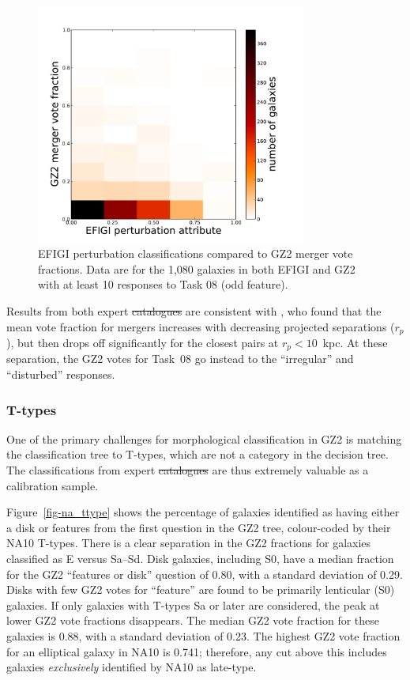 \documentclass[useAMS,usenatbib]{mn2e}
\providecommand{\DIFaddtex}[1]{{\protect\color{blue}\uwave{#1}}} %
\providecommand{\DIFdeltex}[1]{{\protect\color{red}\sout{#1}}}                      %
\providecommand{\DIFaddbegin}{} %
\providecommand{\DIFaddend}{} %
\providecommand{\DIFdelbegin}{} %
\providecommand{\DIFdelend}{} %
\providecommand{\DIFadd}[1]{\texorpdfstring{\DIFaddtex{#1}}{#1}} %
\providecommand{\DIFdel}[1]{\texorpdfstring{\DIFdeltex{#1}}{}} %
\begin{document}
\begin{figure}
\includegraphics[angle=0,width=3.5in]{figures/efigi_mergers.pdf}
\caption{EFIGI perturbation classifications compared to GZ2 merger vote fractions. Data are for the 1,080 galaxies in both EFIGI and GZ2 with at least 10 responses to Task 08 (odd feature). 
\label{fig-efigi_mergers}}
\end{figure}

Results from both expert \DIFdelbegin \DIFdel{catalogues }\DIFdelend \DIFaddbegin \DIFadd{catalogs }\DIFaddend are consistent with \citet{cas13}, who found that the mean vote fraction for mergers increases with decreasing projected separations ($r_p$), but then drops off significantly for the closest pairs at $r_p < 10$~kpc. At these separation, the GZ2 votes for Task~08 go instead to the ``irregular'' and ``disturbed'' responses. 

\subsubsection{T-types}

One of the primary challenges for morphological classification in GZ2 is matching the classification tree to T-types, which are not a category in the decision tree. The classifications from expert \DIFdelbegin \DIFdel{catalogues }\DIFdelend \DIFaddbegin \DIFadd{catalogs }\DIFaddend are thus extremely valuable as a calibration sample. 

Figure~\ref{fig-na_ttype} shows the percentage of galaxies identified as having either a disk or features from the first question in the GZ2 tree, colour-coded by their NA10 T-types. There is a clear separation in the GZ2 fractions for galaxies classified as E versus Sa--Sd. Disk galaxies, including S0, have a median fraction for the GZ2 ``features or disk'' question of 0.80, with a standard deviation of 0.29. Disks with few GZ2 votes for ``feature'' are found to be primarily lenticular (S0) galaxies. If only galaxies with T-types Sa or later are considered, the peak at lower GZ2 vote fractions disappears. The median GZ2 vote fraction for these galaxies is 0.88, with a standard deviation of 0.23. The highest GZ2 vote fraction for an elliptical galaxy in NA10 is 0.741; therefore, any cut above this includes galaxies {\it exclusively} identified by NA10 as late-type. 
\end{document}
